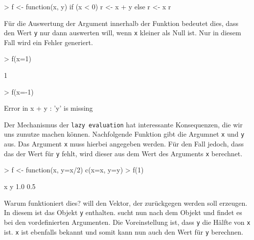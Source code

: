 \documentclass[12pt, a4paper,twoside,openany,x11names,svgnames]{memoir}
\begin{document}
\begin{Schunk}
\begin{Sinput}
> f <- function(x, y){
   if (x < 0) {
     r <- x + y
   } else {
     r <- x
   }
   r
 }
\end{Sinput}
\end{Schunk}

Für die Auswertung der Argument innerhalb der Funktion bedeutet dies, dass \R{} den Wert \texttt{y} nur dann auswerten will, wenn \texttt{x} kleiner als Null ist. Nur in diesem Fall wird ein Fehler generiert.

\begin{Schunk}
\begin{Sinput}
> f(x=1)
\end{Sinput}
\begin{Soutput}
[1] 1
\end{Soutput}
\end{Schunk}
\vspace*{-5mm}
\begin{Schunk}
\begin{Sinput}
> f(x=-1)
\end{Sinput}
\end{Schunk}
\vspace*{-8mm}
\begin{Schunk}
\begin{Soutput}
Error in x + y : 'y' is missing
\end{Soutput}
\end{Schunk}

Der Mechanismus der \texttt{lazy evaluation} hat interessante Konsequenzen, die wir uns zunutze machen können. Nachfolgende Funktion gibt die Argumnet \texttt{x} und \texttt{y} aus. Das Argument \texttt{x} muss hierbei angegeben werden. Für den Fall jedoch, dass das der Wert für \texttt{y} fehlt, wird dieser aus dem Wert des Arguments \texttt{x} berechnet. 

\begin{Schunk}
\begin{Sinput}
> f <- function(x, y=x/2){
   c(x=x, y=y)  
 }
> f(1)
\end{Sinput}
\begin{Soutput}
  x   y 
1.0 0.5 
\end{Soutput}
\end{Schunk}

Warum funktioniert dies? \R{} will den Vektor, der zurückgegen werden soll erzeugen. In diesem ist das Objekt \texttt{y} enthalten. \R{} sucht nun nach dem Objekt und findet es bei den vordefinierten Argumenten. Die Voreinstellung ist, dass \texttt{y} die Hälfte von \texttt{x} ist. \texttt{x} ist ebenfalls bekannt und somit kann \R{} nun auch den Wert für \texttt{y} berechnen. 
\end{document}
